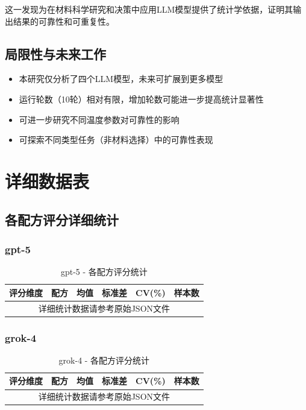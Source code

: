 \documentclass[12pt,a4paper]{article}
\begin{document}
这一发现为在材料科学研究和决策中应用LLM模型提供了统计学依据，证明其输出结果的可靠性和可重复性。

\subsection{局限性与未来工作}

\begin{itemize}
    \item 本研究仅分析了四个LLM模型，未来可扩展到更多模型
    \item 运行轮数（10轮）相对有限，增加轮数可能进一步提高统计显著性
    \item 可进一步研究不同温度参数对可靠性的影响
    \item 可探索不同类型任务（非材料选择）中的可靠性表现
\end{itemize}

\newpage


\appendix

\section{详细数据表}

\subsection{各配方评分详细统计}

\subsubsection{gpt-5}

\begin{table}[H]
\centering
\caption{gpt-5 - 各配方评分统计}
\small
\begin{tabular}{llcccc}
\toprule
\textbf{评分维度} & \textbf{配方} & \textbf{均值} & \textbf{标准差} & \textbf{CV(\%)} & \textbf{样本数} \\
\midrule
\multicolumn{6}{c}{详细统计数据请参考原始JSON文件} \\
\bottomrule
\end{tabular}
\end{table}

\subsubsection{grok-4}

\begin{table}[H]
\centering
\caption{grok-4 - 各配方评分统计}
\small
\begin{tabular}{llcccc}
\toprule
\textbf{评分维度} & \textbf{配方} & \textbf{均值} & \textbf{标准差} & \textbf{CV(\%)} & \textbf{样本数} \\
\midrule
\multicolumn{6}{c}{详细统计数据请参考原始JSON文件} \\
\bottomrule
\end{tabular}
\end{table}
\end{document}

